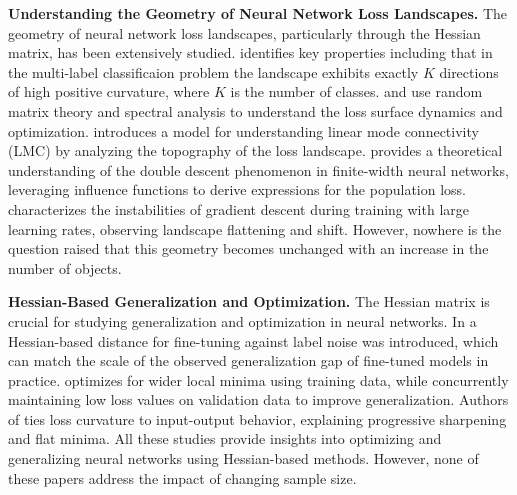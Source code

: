 \documentclass{article}
\begin{document}
\textbf{Understanding the Geometry of Neural Network Loss Landscapes.}
The geometry of neural network loss landscapes, particularly through the Hessian matrix, has been extensively studied. \cite{fort2019emergentpropertieslocalgeometry} identifies key properties including that in the multi-label classificaion problem the landscape exhibits exactly $K$ directions of high positive curvature, where $K$ is the number of classes. \cite{pmlr-v70-pennington17a} and \cite{pmlr-v97-ghorbani19b} use random matrix theory and spectral analysis to understand the loss surface dynamics and optimization. \cite{singh2024landscapinglinearmodeconnectivity} introduces a model for understanding linear mode connectivity (LMC) by analyzing the topography of the loss landscape. \cite{singh2022phenomenologydoubledescentfinitewidth} provides a theoretical understanding of the double descent phenomenon in finite-width neural networks, leveraging influence functions to derive expressions for the population loss. \cite{wang2023instabilitieslargelearningrate} characterizes the instabilities of gradient descent during training with large learning rates, observing landscape flattening and shift. However, nowhere is the question raised that this geometry becomes unchanged with an increase in the number of objects.

\textbf{Hessian-Based Generalization and Optimization.}
The Hessian matrix is crucial for studying generalization and optimization in neural networks. In \cite{ju2023robustfinetuningdeepneural} a Hessian-based distance for fine-tuning against label noise was introduced, which can match the scale of the observed generalization gap of fine-tuned models in practice. \cite{nguyen2024agnosticsharpnessawareminimization} optimizes for wider local minima using training data, while concurrently maintaining low loss values on validation data to improve generalization. Authors of \cite{macdonald2023progressivesharpeningflatminima} ties loss curvature to input-output behavior, explaining progressive sharpening and flat minima. All these studies provide insights into optimizing and generalizing neural networks using Hessian-based methods. However, none of these papers address the impact of changing sample size.
\end{document}
